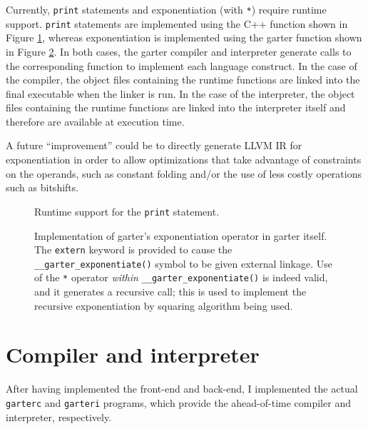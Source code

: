 \documentclass[11pt]{article}
\begin{document}
\label{sec:runtime}

Currently, {\tt print} statements and exponentiation (with {\tt **}) require
runtime support.  {\tt print} statements are implemented using the C++ function
shown in Figure \ref{fig:print}, whereas exponentiation is implemented using the
garter function shown in Figure \ref{fig:exponentiate}.  In both cases, the
garter compiler and interpreter generate calls to the corresponding function to
implement each language construct.  In the case of the compiler, the object
files containing the runtime functions are linked into the final executable when
the linker is run.  In the case of the interpreter, the object files containing
the runtime functions are linked into the interpreter itself and therefore are
available at execution time.

A future ``improvement'' could be to directly generate LLVM IR for
exponentiation in order to allow optimizations that take advantage of
constraints on the operands, such as constant folding and/or the use of less
costly operations such as bitshifts.

\begin{figure}
    \lstset{language=C++}
    \lstset{numbers=left}
    
    \caption{Runtime support for the {\tt print} statement.}
    \label{fig:print}
\end{figure}

\begin{figure}
    \lstset{numbers=left}
    
    \caption{Implementation of garter's exponentiation operator in garter itself.
        The {\tt extern} keyword is provided to cause the {\tt
        \_\_garter\_exponentiate()} symbol to be given external linkage.  Use of
        the {\tt **} operator {\em within} {\tt \_\_garter\_exponentiate()} is
        indeed valid, and it generates a recursive call; this is used to
        implement the recursive exponentiation by squaring algorithm being used.
    }
    \label{fig:exponentiate}
\end{figure}

\section{Compiler and interpreter}

After having implemented the front-end and back-end, I implemented the actual
{\tt garterc} and {\tt garteri} programs, which provide the ahead-of-time
compiler and interpreter, respectively.
\end{document}

